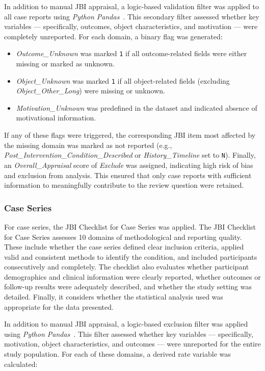 \begin{appendices}
In addition to manual JBI appraisal, a logic-based validation filter was applied to all case reports using \textit{Python Pandas}~\cite{ThePandasDevelopmentTeam_2020}. This secondary filter assessed whether key variables --- specifically, outcomes, object characteristics, and motivation --- were completely unreported. For each domain, a binary flag was generated:

\begin{itemize}
\item \textit{Outcome\_Unknown} was marked \texttt{1} if all outcome-related fields were either missing or marked as unknown.
\item \textit{Object\_Unknown} was marked \texttt{1} if all object-related fields (excluding \textit{Object\_Other\_Long}) were missing or unknown.
\item \textit{Motivation\_Unknown} was predefined in the dataset and indicated absence of motivational information.
\end{itemize}

If any of these flags were triggered, the corresponding JBI item most affected by the missing domain was marked as not reported (e.g., \textit{Post\_Intervention\_Condition\_Described} or \textit{History\_Timeline} set to \texttt{N}). Finally, an \textit{Overall\_Appraisal} score of \textit{Exclude} was assigned, indicating high risk of bias and exclusion from analysis. This ensured that only case reports with sufficient information to meaningfully contribute to the review question were retained.\\

\subsubsection{Case Series}
For case series, the JBI Checklist for Case Series was applied. The JBI Checklist for Case Series assesses 10 domains of methodological and reporting quality. These include whether the case series defined clear inclusion criteria, applied valid and consistent methods to identify the condition, and included participants consecutively and completely. The checklist also evaluates whether participant demographics and clinical information were clearly reported, whether outcomes or follow-up results were adequately described, and whether the study setting was detailed. Finally, it considers whether the statistical analysis used was appropriate for the data presented.

In addition to manual JBI appraisal, a logic-based exclusion filter was applied using \textit{Python Pandas}~\cite{ThePandasDevelopmentTeam_2020}. This filter assessed whether key variables --- specifically, motivation, object characteristics, and outcomes --- were unreported for the entire study population. For each of these domains, a derived rate variable was calculated:


\end{appendices}
